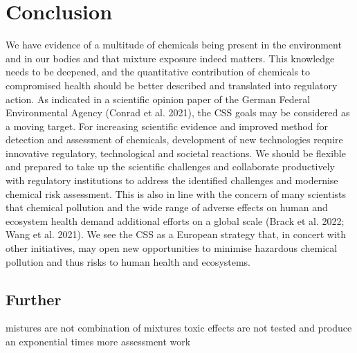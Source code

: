 \chapter{Conclusion}

We have evidence of a multitude of chemicals being present in the environment and in our bodies and that mixture exposure indeed matters. This knowledge needs to be deepened, and the quantitative contribution of chemicals to compromised health should be better described and translated into regulatory action. As indicated in a scientific opinion paper of the German Federal Environmental Agency (Conrad et al. 2021), the CSS goals may be considered as a moving target. For increasing scientific evidence and improved method for detection and assessment of chemicals, development of new technologies require innovative regulatory, technological and societal reactions. We should be flexible and prepared to take up the scientific challenges and collaborate productively with regulatory institutions to address the identified challenges and modernise chemical risk assessment. This is also in line with the concern of many scientists that chemical pollution and the wide range of adverse effects on human and ecosystem health demand additional efforts on a global scale (Brack et al. 2022; Wang et al. 2021). We see the CSS as a European strategy that, in concert with other initiatives, may open new opportunities to minimise hazardous chemical pollution and thus risks to human health and ecosystems.


\section{Further}
mistures are not combination of mixtures toxic effects are not tested and produce an exponential times more assessment work
